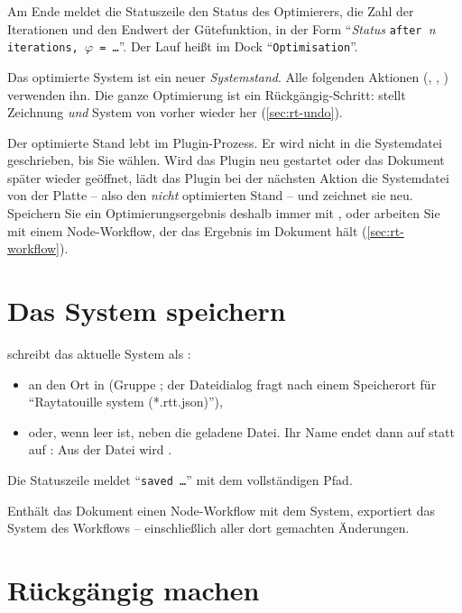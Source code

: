 Am Ende meldet die Statuszeile den Status des Optimierers, die Zahl der Iterationen und den
Endwert der Gütefunktion, in der Form \enquote{\textit{Status} \texttt{after }\textit{n}\texttt{ iterations, }$\varphi$\texttt{ = …}}. Der Lauf heißt im Dock  \enquote{\texttt{Optimisation}}.

Das optimierte System ist ein neuer \emph{Systemstand}. Alle folgenden Aktionen
(, , ) verwenden ihn. Die ganze Optimierung ist
ein Rückgängig-Schritt:  stellt Zeichnung \emph{und} System von vorher wieder her
(\autoref{sec:rt-undo}).

\begin{warnung}
Der optimierte Stand lebt im Plugin-Prozess. Er wird nicht in die Systemdatei geschrieben, bis
Sie  wählen. Wird das Plugin neu gestartet oder das Dokument später wieder
geöffnet, lädt das Plugin bei der nächsten Aktion die Systemdatei von der Platte -- also den
\emph{nicht} optimierten Stand -- und zeichnet sie neu. Speichern Sie ein Optimierungsergebnis
deshalb immer mit , oder arbeiten Sie mit einem Node-Workflow, der das Ergebnis
im Dokument hält (\autoref{sec:rt-workflow}).
\end{warnung}

\section{Das System speichern}\label{sec:rt-speichern}

 schreibt das aktuelle System als :
\begin{itemize}
  \item an den Ort in  (Gruppe ; der Dateidialog fragt nach einem
    Speicherort für \enquote{Raytatouille system (*.rtt.json)}),
  \item oder, wenn  leer ist, neben die geladene Datei. Ihr Name endet dann
    auf  statt auf : Aus der Datei
     wird .
\end{itemize}
Die Statuszeile meldet \enquote{\texttt{saved …}} mit dem vollständigen Pfad.

Enthält das Dokument einen Node-Workflow mit dem System, exportiert  das System
des Workflows -- einschließlich aller dort gemachten Änderungen.

\section{Rückgängig machen}\label{sec:rt-undo}


